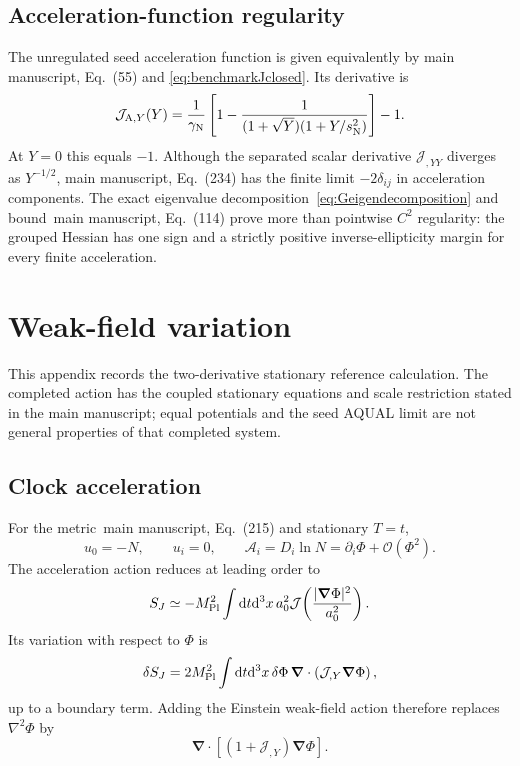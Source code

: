 \documentclass[aps,prd,reprint,onecolumn,notitlepage,nofootinbib,longbibliography,floatfix]{revtex4-2}
\theoremstyle{scstyle}
\theoremstyle{definition}
\theoremstyle{remark}
\newcommand{\dd}{\mathrm{d}}
\newcommand{\mpl}{M_{\rm Pl}}
\newcommand{\cJ}{\mathcal J}
\newcommand{\cA}{\mathcal A}
\newcommand{\cO}{\mathcal O}
\begin{document}
\subsection{Acceleration-function regularity}

The unregulated seed acceleration function is given equivalently by main manuscript, Eq.~(55) and \eqref{eq:benchmarkJclosed}. Its derivative is
\begin{equation}
\cJ_{{\rm A},Y}(Y)
=\frac{1}{\gamma_{\rm N}}
\left[
1-\frac{1}{(1+\sqrt Y)(1+Y/s_{\rm N}^2)}
\right]-1.
\label{eq:benchmarkJderivatives}
\end{equation}
At $Y=0$ this equals $-1$. Although the separated scalar derivative $\cJ_{,YY}$ diverges as $Y^{-1/2}$, main manuscript, Eq.~(234) has the finite limit $-2\delta_{ij}$ in acceleration components. The exact eigenvalue decomposition~\eqref{eq:Geigendecomposition} and bound~main manuscript, Eq.~(114) prove more than pointwise $C^2$ regularity: the grouped Hessian has one sign and a strictly positive inverse-ellipticity margin for every finite acceleration.

\section{Weak-field variation}
\label{app:weakfield}
This appendix records the two-derivative stationary reference calculation. The completed action has the coupled stationary equations and scale restriction stated in the main manuscript; equal potentials and the seed AQUAL limit are not general properties of that completed system.

\subsection{Clock acceleration}

For the metric~main manuscript, Eq.~(215) and stationary $T=t$,
\begin{equation}
u_0=-N,
\qquad
u_i=0,
\qquad
\cA_i=D_i\ln N=\partial_i\Phi+\cO(\Phi^2).
\label{eq:weakaccapp}
\end{equation}
The acceleration action reduces at leading order to
\begin{equation}
S_J\simeq
-\mpl^2\int\dd t\dd^3x\,a_0^2
\cJ\!\left(\frac{|\bm\nabla\Phi|^2}{a_0^2}\right).
\label{eq:SJweak}
\end{equation}
Its variation with respect to $\Phi$ is
\begin{equation}
\delta S_J
=2\mpl^2\int\dd t\dd^3x\,
\delta\Phi\,
\bm\nabla\cdot\left(\cJ_{,Y}\bm\nabla\Phi\right),
\label{eq:SJvariation}
\end{equation}
up to a boundary term. Adding the Einstein weak-field action therefore replaces $\nabla^2\Phi$ by
\begin{equation}
\bm\nabla\cdot\left[(1+\cJ_{,Y})\bm\nabla\Phi\right].
\label{eq:poissonreplacement}
\end{equation}
\end{document}
